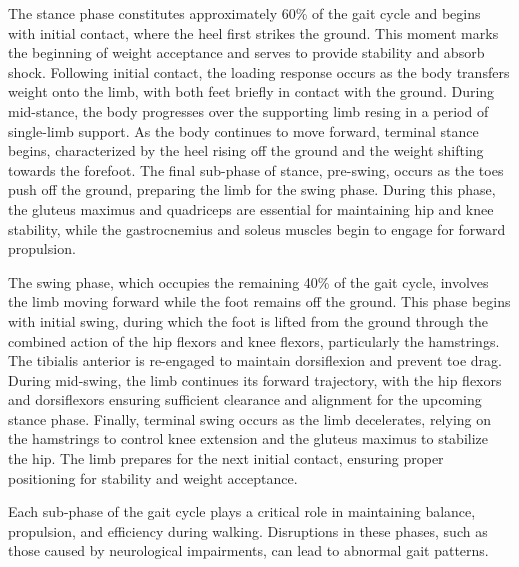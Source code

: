 The stance phase constitutes approximately 60\% of the gait cycle and begins with initial contact, where the heel first strikes the ground. This moment marks the beginning of weight acceptance and serves to provide stability and absorb shock. Following initial contact, the loading response occurs as the body transfers weight onto the limb, with both feet briefly in contact with the ground. During mid-stance, the body progresses over the supporting limb resing in a period of single-limb support. As the body continues to move forward, terminal stance begins, characterized by the heel rising off the ground and the weight shifting towards the forefoot. The final sub-phase of stance, pre-swing, occurs as the toes push off the ground, preparing the limb for the swing phase. During this phase, the gluteus maximus and quadriceps are essential for maintaining hip and knee stability, while the gastrocnemius and soleus muscles begin to engage for forward propulsion.

The swing phase, which occupies the remaining 40\% of the gait cycle, involves the limb moving forward while the foot remains off the ground. This phase begins with initial swing, during which the foot is lifted from the ground through the combined action of the hip flexors and knee flexors, particularly the hamstrings. The tibialis anterior is re-engaged to maintain dorsiflexion and prevent toe drag. During mid-swing, the limb continues its forward trajectory, with the hip flexors and dorsiflexors ensuring sufficient clearance and alignment for the upcoming stance phase. Finally, terminal swing occurs as the limb decelerates, relying on the hamstrings to control knee extension and the gluteus maximus to stabilize the hip. The limb prepares for the next initial contact, ensuring proper positioning for stability and weight acceptance.

Each sub-phase of the gait cycle plays a critical role in maintaining balance, propulsion, and efficiency during walking. Disruptions in these phases, such as those caused by neurological impairments, can lead to abnormal gait patterns.






